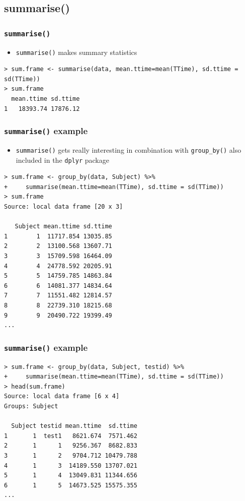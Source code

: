 \documentclass[xcolor={table},c]{beamer}
\begin{document}
\subsection{summarise()}
\begin{frame}[fragile]\frametitle{\texttt{summarise()}}
  \begin{itemize}
  \item \texttt{summarise()} makes summary statistics
  \end{itemize}
\begin{verbatim}
> sum.frame <- summarise(data, mean.ttime=mean(TTime), sd.ttime = sd(TTime))
> sum.frame
  mean.ttime sd.ttime
1   18393.74 17876.12  
\end{verbatim}
\end{frame}


\begin{frame}[fragile]\frametitle{\texttt{summarise()} example}
  \begin{itemize}
  \item \texttt{summarise()} gets really interesting in combination with \texttt{group\_by()} also included in the \texttt{dplyr} package
  \end{itemize}\footnotesize
\begin{verbatim}
> sum.frame <- group_by(data, Subject) %>%
+     summarise(mean.ttime=mean(TTime), sd.ttime = sd(TTime))
> sum.frame
Source: local data frame [20 x 3]

   Subject mean.ttime sd.ttime
1        1  11717.854 13035.85
2        2  13100.568 13607.71
3        3  15709.598 16464.09
4        4  24778.592 20205.91
5        5  14759.785 14863.84
6        6  14081.377 14834.64
7        7  11551.482 12814.57
8        8  22739.310 18215.68
9        9  20490.722 19399.49
...
\end{verbatim}
\end{frame}


\begin{frame}[fragile]\frametitle{\texttt{summarise()} example}
\footnotesize
\begin{verbatim}
> sum.frame <- group_by(data, Subject, testid) %>%
+     summarise(mean.ttime=mean(TTime), sd.ttime = sd(TTime))
> head(sum.frame)
Source: local data frame [6 x 4]
Groups: Subject

  Subject testid mean.ttime  sd.ttime
1       1  test1   8621.674  7571.462
2       1      1   9256.367  8682.833
3       1      2   9704.712 10479.788
4       1      3  14189.550 13707.021
5       1      4  13049.831 11344.656
6       1      5  14673.525 15575.355
...
\end{verbatim}
\end{frame}
\end{document}
